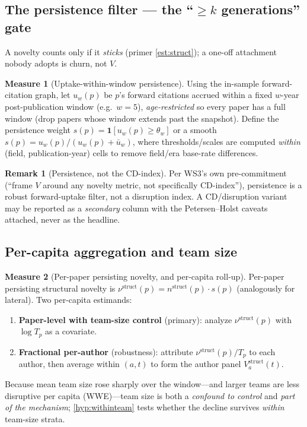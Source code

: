 \documentclass[11pt,letterpaper]{article}
\theoremstyle{definition}
\newtheorem{measure}{Measure}
\newtheorem{remark}{Remark}[section]
\theoremstyle{plain}
\newcommand{\Vstruct}{V^{\mathrm{struct}}}
\begin{document}
\subsection{The persistence filter --- the ``$\ge k$ generations'' gate}\label{sec:persist}

A novelty counts only if it \emph{sticks} (primer \cref{est:struct}); a one-off
attachment nobody adopts is churn, not $V$.

\begin{measure}[Uptake-within-window persistence]\label{meas:persist}
Using the in-sample forward-citation graph, let $u_w(p)$ be $p$'s forward
citations accrued within a fixed $w$-year post-publication window (e.g.\ $w=5$),
\emph{age-restricted} so every paper has a full window (drop papers whose window
extends past the snapshot). Define the persistence weight
$s(p) = \mathbf{1}[u_w(p) \ge \theta_w]$ or a smooth $s(p) =
u_w(p)/(u_w(p)+\bar u_w)$, where thresholds/scales are computed \emph{within}
(field, publication-year) cells to remove field/era base-rate differences.
\end{measure}

\begin{remark}[Persistence, not the CD-index]
Per WS3's own pre-commitment (``frame $V$ around any novelty metric, not
specifically CD-index''), persistence is a robust forward-uptake filter, not a
disruption index. A CD/disruption variant may be reported as a \emph{secondary}
column with the Petersen--Holst caveats attached, never as the headline.
\end{remark}

\subsection{Per-capita aggregation and team size}\label{sec:percap}

\begin{measure}[Per-paper persisting novelty, and per-capita roll-up]\label{meas:rollup}
Per-paper persisting structural novelty is
$\nu^{\mathrm{struct}}(p) = n^{\mathrm{struct}}(p)\cdot s(p)$ (analogously for
lateral). Two per-capita estimands:
\begin{enumerate}[label=(\roman*)]
  \item \textbf{Paper-level with team-size control} (primary): analyze
  $\nu^{\mathrm{struct}}(p)$ with $\log T_p$ as a covariate.
  \item \textbf{Fractional per-author} (robustness): attribute
  $\nu^{\mathrm{struct}}(p)/T_p$ to each author, then average within
  $(a,t)$ to form the author panel $\Vstruct_a(t)$.
\end{enumerate}
Because mean team size rose sharply over the window---and larger teams are less
disruptive per capita (WWE)---team size is both a \emph{confound to control} and
\emph{part of the mechanism}; \cref{hyp:withinteam} tests whether the decline
survives \emph{within} team-size strata.
\end{measure}
\end{document}
